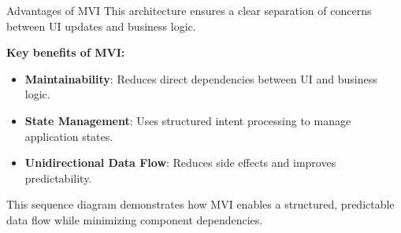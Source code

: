 \documentclass[aspectratio=169, table]{beamer}
\begin{document}
\begin{frame}[fragile]{Advantages of MVI}
	\vspace{20pt}
	This architecture ensures a clear separation of concerns between UI updates and business logic.
	
	\textbf{Key benefits of MVI:}
	\begin{itemize}
		\item \textbf{Maintainability}: Reduces direct dependencies between UI and business logic.
		\item \textbf{State Management}: Uses structured intent processing to manage application states.
		\item \textbf{Unidirectional Data Flow}: Reduces side effects and improves predictability.
	\end{itemize}
	
	This sequence diagram demonstrates how MVI enables a structured, predictable data flow while minimizing component dependencies.
\end{frame}
\end{document}
